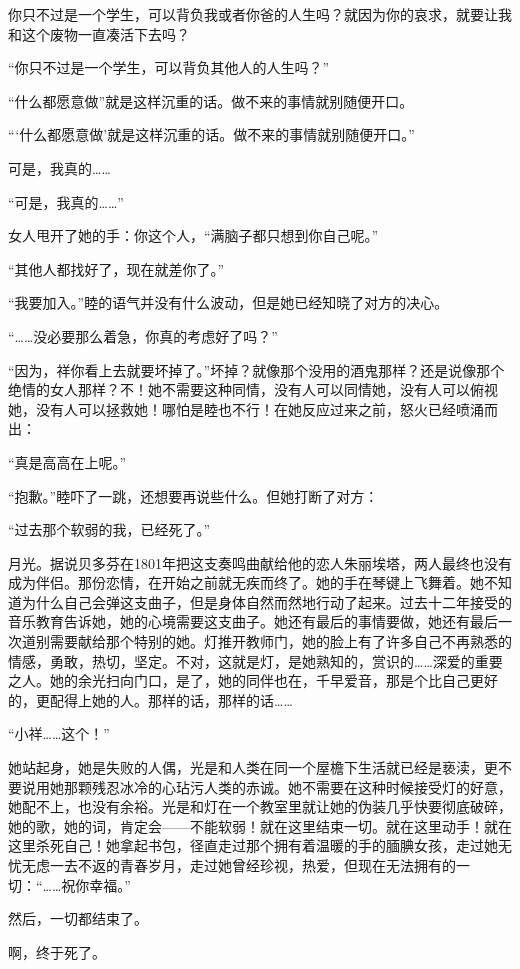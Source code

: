 \documentclass{article}
\begin{document}
你只不过是一个学生，可以背负我或者你爸的人生吗？就因为你的哀求，就要让我和这个废物一直凑活下去吗？



“你只不过是一个学生，可以背负其他人的人生吗？”



“什么都愿意做”就是这样沉重的话。做不来的事情就别随便开口。



“‘什么都愿意做’就是这样沉重的话。做不来的事情就别随便开口。”



可是，我真的……



“可是，我真的……”



女人甩开了她的手：你这个人，“满脑子都只想到你自己呢。”



“其他人都找好了，现在就差你了。”



“我要加入。”睦的语气并没有什么波动，但是她已经知晓了对方的决心。



“……没必要那么着急，你真的考虑好了吗？”



“因为，祥你看上去就要坏掉了。”坏掉？就像那个没用的酒鬼那样？还是说像那个绝情的女人那样？不！她不需要这种同情，没有人可以同情她，没有人可以俯视她，没有人可以拯救她！哪怕是睦也不行！在她反应过来之前，怒火已经喷涌而出：



“真是高高在上呢。”



“抱歉。”睦吓了一跳，还想要再说些什么。但她打断了对方：



“过去那个软弱的我，已经死了。”



月光。据说贝多芬在1801年把这支奏鸣曲献给他的恋人朱丽埃塔，两人最终也没有成为伴侣。那份恋情，在开始之前就无疾而终了。她的手在琴键上飞舞着。她不知道为什么自己会弹这支曲子，但是身体自然而然地行动了起来。过去十二年接受的音乐教育告诉她，她的心境需要这支曲子。她还有最后的事情要做，她还有最后一次道别需要献给那个特别的她。灯推开教师门，她的脸上有了许多自己不再熟悉的情感，勇敢，热切，坚定。不对，这就是灯，是她熟知的，赏识的……深爱的重要之人。她的余光扫向门口，是了，她的同伴也在，千早爱音，那是个比自己更好的，更配得上她的人。那样的话，那样的话……



“小祥……这个！”



她站起身，她是失败的人偶，光是和人类在同一个屋檐下生活就已经是亵渎，更不要说用她那颗残忍冰冷的心玷污人类的赤诚。她不需要在这种时候接受灯的好意，她配不上，也没有余裕。光是和灯在一个教室里就让她的伪装几乎快要彻底破碎，她的歌，她的词，肯定会——不能软弱！就在这里结束一切。就在这里动手！就在这里杀死自己！她拿起书包，径直走过那个拥有着温暖的手的腼腆女孩，走过她无忧无虑一去不返的青春岁月，走过她曾经珍视，热爱，但现在无法拥有的一切：“……祝你幸福。”



然后，一切都结束了。



啊，终于死了。
\end{document}
